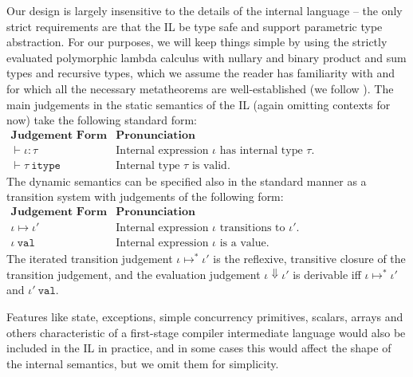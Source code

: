 Our design is largely insensitive to the details of the internal language -- the only strict requirements are that the IL be type safe and support parametric type abstraction. For our purposes, we will keep things simple by using the strictly evaluated polymorphic lambda calculus with nullary and binary product and sum types and recursive types, which we assume the reader has familiarity with and for which all the necessary metatheorems are well-established (we follow \cite{pfpl}). The main judgements in the static semantics of the IL (again omitting contexts for now) take the following standard form:
\\[1ex]
$
\begin{array}{ll}
\textbf{Judgement Form} & \textbf{Pronunciation}\\
\vdash \iota : \tau & \text{Internal expression $\iota$ has internal type $\tau$.}\\
\vdash \tau~\mathtt{itype} & \text{Internal type $\tau$ is valid.}
\end{array}
$\\

\noindent
The dynamic semantics can be specified also in the standard manner as a transition system with  judgements of the following form:
\\[1ex]
$
\begin{array}{ll}
\textbf{Judgement Form} & \textbf{Pronunciation}\\
\iota \mapsto \iota' & \text{Internal expression $\iota$ transitions to $\iota'$.}\\
\iota~\mathtt{val} & \text{Internal expression $\iota$ is a value.}
\end{array}
$
\\[1ex]
The iterated transition judgement $\iota \mapsto^{*} \iota'$ is the reflexive, transitive closure of the transition judgement, and the evaluation judgement $\iota \Downarrow \iota'$ is derivable iff $\iota \mapsto^{*} \iota'$ and $\iota'~\mathtt{val}$.

Features like state, exceptions, simple concurrency primitives, scalars, arrays and others characteristic of a first-stage compiler intermediate language would also be included in the IL in practice, and in some cases this would affect the shape of the internal semantics, but we omit them for simplicity. %


